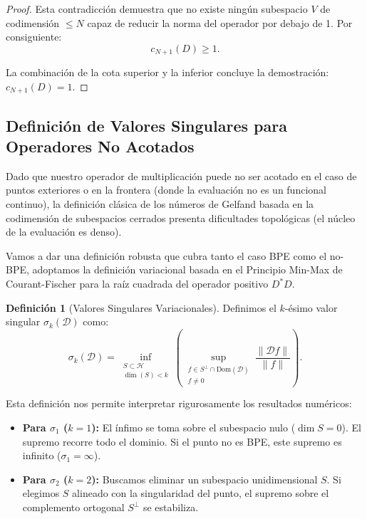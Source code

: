 \documentclass[12pt,a4paper]{article}
\theoremstyle{definition}
\newtheorem{definicion}{Definición}
\theoremstyle{remark}
\begin{document}
\begin{proof}
    Esta contradicción demuestra que no existe ningún subespacio $V$ de codimensión $\le N$ capaz de reducir la norma del operador por debajo de 1. Por consiguiente:
    $$ c_{N+1}(D) \ge 1. $$

    La combinación de la cota superior y la inferior concluye la demostración: $c_{N+1}(D) = 1$.
\end{proof}

\subsection{Definición de Valores Singulares para Operadores No Acotados}

Dado que nuestro operador de multiplicación puede no ser acotado en el caso de puntos exteriores o en la frontera (donde la evaluación no es un funcional continuo), la definición clásica de los números de Gelfand basada en la codimensión de subespacios cerrados presenta dificultades topológicas (el núcleo de la evaluación es denso).

Vamos a dar una definición robusta que cubra tanto el caso BPE como el no-BPE, adoptamos la definición variacional basada en el Principio Min-Max de Courant-Fischer para la raíz cuadrada del operador positivo $D^*D$.

\begin{definicion}[Valores Singulares Variacionales]
    Definimos el $k$-ésimo valor singular $\sigma_k(\mathcal{D})$ como:
    $$ \sigma_k(\mathcal{D}) = \inf_{\substack{S \subset \mathcal{H} \\ \dim(S) < k}} \left( \sup_{\substack{f \in S^\perp \cap \text{Dom}(\mathcal{D}) \\ f \neq 0}} \frac{\|\mathcal{D}f\|}{\|f\|} \right). $$
\end{definicion}

Esta definición nos permite interpretar rigurosamente los resultados numéricos:
\begin{itemize}
    \item \textbf{Para $\sigma_1$ ($k=1$):} El ínfimo se toma sobre el subespacio nulo ($\dim S = 0$). El supremo recorre todo el dominio. Si el punto no es BPE, este supremo es infinito ($\sigma_1 = \infty$).
    \item \textbf{Para $\sigma_2$ ($k=2$):} Buscamos eliminar un subespacio unidimensional $S$. Si elegimos $S$ alineado con la singularidad del punto, el supremo sobre el complemento ortogonal $S^\perp$ se estabiliza.
\end{itemize}
\end{document}
